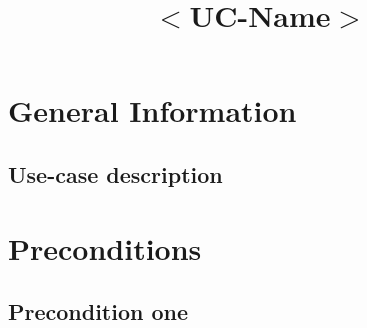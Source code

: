 \documentclass[notitlepage,fullpage]{article}
\date{}
\title{$<$UC-Name$>$}
\begin{document}
   \maketitle
\vspace{-2cm}%
\begin{comment}
	\begin{color}{blue}
  		\noindent\textbf{Note}: this template is provided to help on writing a use case specification. The text in blue is included to guide the authors.]
  \end{color}
\end{comment}

\section{General Information}
\subsection{Use-case description}

\begin{comment}
	\textcolor{blue}{\noindent The description communicates the reason(s) of the use case. In general, a well-written description comprises: (a)  the problem which the use case solves; (b) the importance that the use case has in the whole system; and (c) what is achieved by executing the use case. A single or two paragraphs will suffice for this description.}
\end{comment}


\section{Preconditions}

\begin{comment}
	\textcolor{blue}{A precondition of a use case represents the state of the system that must be present (i.e., must be true) prior to a use case being performed. A well-defined precondition can be easily checked. For example, instead of saying that a system B must available, it should tell the system's name, accessing address, among others.}%
\end{comment}

\subsection{Precondition one}
\begin{comment}
   \textcolor{blue}{A first precondition.}
\end{comment}
\end{document}
